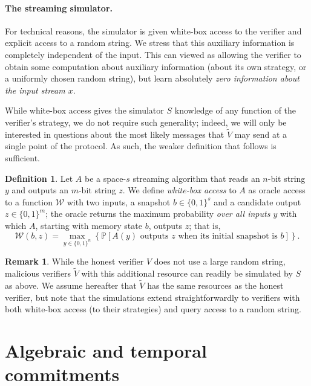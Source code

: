 \documentclass[a4paper,UKenglish,cleveref, autoref, thm-restate]{lipics-v2021}
\theoremstyle{definition}
\newtheorem{remark}[theorem]{Remark}
\newtheorem{definition}[theorem]{Definition}
\renewcommand{\P}{\mathbb P}
\renewcommand{\set}[1]{\left\{#1\right\}}
\newcommand{\bitset}{\{0,1\}}
\newcommand{\snapshot}{b}
\newcommand{\whiteboxoracle}{\mathcal{W}}
\begin{document}
\paragraph*{The streaming simulator\iflipics\else.\fi}
For technical reasons, the simulator is given white-box access to the verifier and explicit access to a random string. We stress that this auxiliary information is completely independent of the input. This can viewed as allowing the verifier to obtain some computation about auxiliary information (about its own strategy, or a uniformly chosen random string), but learn absolutely \emph{zero information about the input stream $x$}. 

While white-box access gives the simulator $S$ knowledge of any function of the verifier's strategy, we do not require such generality; indeed, we will only be interested in questions about the most likely messages that $\widetilde V$ may send at a single point of the protocol. As such, the weaker definition that follows is sufficient.

\begin{definition}
    \label{def:whitebox-max}
    Let $A$ be a space-$s$ streaming algorithm that reads an $n$-bit string $y$ and outputs an $m$-bit string $z$. We define \emph{white-box access} to $A$ as oracle access to a function $\whiteboxoracle$ with two inputs, a snapshot $\snapshot \in \bitset^s$ and a candidate output $z \in \bitset^m$; the oracle returns the maximum probability \emph{over all inputs $y$} with which $A$, starting with memory state $\snapshot$, outputs $z$; that is,
    \begin{equation*}
        \whiteboxoracle(\snapshot,z) = \max_{y \in \bitset^n}\set{\P[A(y) \text{ outputs } z \text{ when its initial snapshot is } \snapshot]}.
    \end{equation*}
\end{definition}

\begin{remark}
    \label{rem:streaming-vs-memory-bottleneck}
    While the honest verifier $V$ does not use a large random string, malicious verifiers $\widetilde V$ with this additional resource can readily be simulated by $S$ as above. We assume hereafter that $\widetilde V$ has the same resources as the honest verifier, but note that the simulations extend straightforwardly to verifiers with both white-box access (to their strategies) and query access to a random string.    
\end{remark}

\section{Algebraic and temporal commitments}
\label{sec:commitment-protocols}
\end{document}
